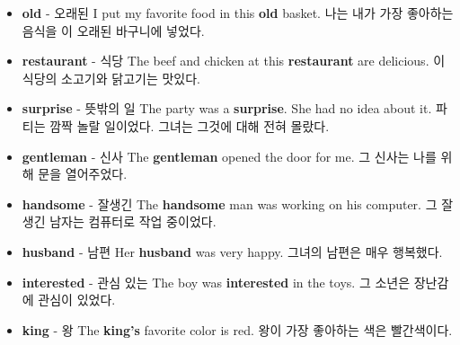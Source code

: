 \documentclass{article}
\begin{document}
\begin{addmargin}[1em]{1em}
\begin{itemize}
        \item \fontsize{12pt}{14pt}\selectfont \textbf{old} - 오래된 \newline
        I put my favorite food in this \textbf{old} basket. \newline
        나는 내가 가장 좋아하는 음식을 이 오래된 바구니에 넣었다.

        \item \fontsize{12pt}{14pt}\selectfont \textbf{restaurant} - 식당 \newline
        The beef and chicken at this \textbf{restaurant} are delicious. \newline
        이 식당의 소고기와 닭고기는 맛있다.

        \item \fontsize{12pt}{14pt}\selectfont \textbf{surprise} - 뜻밖의 일 \newline
        The party was a \textbf{surprise}. She had no idea about it. \newline
        파티는 깜짝 놀랄 일이었다. 그녀는 그것에 대해 전혀 몰랐다.

        \item \fontsize{12pt}{14pt}\selectfont \textbf{gentleman} - 신사 \newline
        The \textbf{gentleman} opened the door for me. \newline
        그 신사는 나를 위해 문을 열어주었다.

        \item \fontsize{12pt}{14pt}\selectfont \textbf{handsome} - 잘생긴 \newline
        The \textbf{handsome} man was working on his computer. \newline
        그 잘생긴 남자는 컴퓨터로 작업 중이었다.

        \item \fontsize{12pt}{14pt}\selectfont \textbf{husband} - 남편 \newline
        Her \textbf{husband} was very happy. \newline
        그녀의 남편은 매우 행복했다.

        \item \fontsize{12pt}{14pt}\selectfont \textbf{interested} - 관심 있는 \newline
        The boy was \textbf{interested} in the toys. \newline
        그 소년은 장난감에 관심이 있었다.

        \item \fontsize{12pt}{14pt}\selectfont \textbf{king} - 왕 \newline
        The \textbf{king's} favorite color is red. \newline
        왕이 가장 좋아하는 색은 빨간색이다.


\end{itemize}
\end{addmargin}
\end{document}
